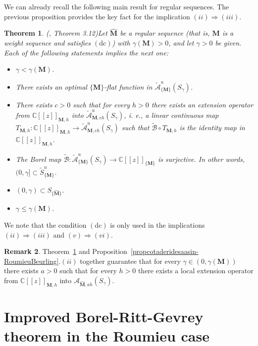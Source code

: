 \documentclass[11pt,a4paper]{article}
\theoremstyle{plain}
\newtheorem{theorem}{Theorem}[section]
\theoremstyle{definition}
\newtheorem{remark}[theorem]{Remark}
\numberwithin{equation}{section}
\newcommand{\C}{\mathbb{C}}
\newcommand{\M}{{\boldsymbol{M}}}
\newcommand{\hM}{\widehat{{\boldsymbol{M}}}}
\def\ga{\gamma}
\newcommand{\dc}{\operatorname{(dc)}}
\begin{document}
We can already recall the following main result for regular sequences. The previous proposition provides the key fact for the implication $(ii)\Rightarrow(iii)$.

\begin{theorem}(\cite{JimenezMiguelSanzSchindlOptFlat}, Theorem 3.12)\label{teor.surjectRoumieuwithDC}
Let $\hM$ be a regular sequence (that is, $\M$ is a weight sequence and satisfies $\dc$) with $\ga(\M)>0$, and let $\ga>0$ be given. Each of the following statements implies the next one:
\begin{itemize}
\item[(i)] $\ga<\ga(\M)$.
\item[(ii)] There exists an optimal $\{\M\}$-flat function in $\widetilde{\mathcal{A}}^u_{\{\M\}}(S_{\ga})$.
\item[(iii)] There exists $c>0$ such that for every $h>0$ there exists an extension operator from $\C[[z]]_{\M,h}$ into $\widetilde{\mathcal{A}}^u_{\M,ch}(S_{\ga})$, i. e., a linear continuous map $T_{\M,h}\colon\C[[z]]_{\M,h}\to \widetilde{\mathcal{A}}^u_{\M,ch}(S_{\ga})$ such that $\widetilde{\mathcal{B}}\circ T_{\M,h}$ is the identity map in $\C[[z]]_{\M,h}$.
\item[(iv)] The Borel map $\widetilde{\mathcal{B}}\colon \widetilde{\mathcal{A}}^u_{\{\M\}}(S_{\ga})\to\C[[z]]_{\{\M\}}$ is surjective. In other words, $(0,\ga]\subset\widetilde{S}_{\{\M\}}^u$.
\item[(v)] $(0,\ga)\subset S_{\{\hM\}}$.
\item[(vi)] $\ga\le\ga(\M)$.
\end{itemize}
\end{theorem}

We note that the condition $\dc$ is only used in the implications $(ii)\Rightarrow (iii)$ and $(v)\Rightarrow(vi)$.

\begin{remark}\label{rem.extension-operators-bounded-deriv}
Theorem~\ref{teor.surjectRoumieuwithDC} and Proposition~\ref{propcotaderidesaasin-RoumieuBeurling}.$(ii)$ together guarantee that for every $\ga\in(0,\ga(\M))$ there exists $a>0$ such that for every $h>0$ there exists a local extension operator from $\C[[z]]_{\M,h}$ into $\mathcal{A}_{\hM,ah}(S_{\ga})$.
\end{remark}


\section{Improved Borel-Ritt-Gevrey theorem in the Roumieu case}\label{sect.Improvements.Roumieu}
\end{document}
